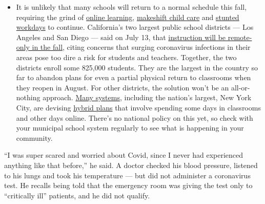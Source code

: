 \begin{itemize}
  \begin{itemize}
  \tightlist
  \item
    It is unlikely that many schools will return to a normal schedule
    this fall, requiring the grind of
    \href{https://www.nytimes.com/2020/06/05/us/coronavirus-education-lost-learning.html?action=click\&pgtype=Article\&state=default\&region=MAIN_CONTENT_3\&context=storylines_faq}{online
    learning},
    \href{https://www.nytimes.com/2020/05/29/us/coronavirus-child-care-centers.html?action=click\&pgtype=Article\&state=default\&region=MAIN_CONTENT_3\&context=storylines_faq}{makeshift
    child care} and
    \href{https://www.nytimes.com/2020/06/03/business/economy/coronavirus-working-women.html?action=click\&pgtype=Article\&state=default\&region=MAIN_CONTENT_3\&context=storylines_faq}{stunted
    workdays} to continue. California's two largest public school
    districts --- Los Angeles and San Diego --- said on July 13, that
    \href{https://www.nytimes.com/2020/07/13/us/lausd-san-diego-school-reopening.html?action=click\&pgtype=Article\&state=default\&region=MAIN_CONTENT_3\&context=storylines_faq}{instruction
    will be remote-only in the fall}, citing concerns that surging
    coronavirus infections in their areas pose too dire a risk for
    students and teachers. Together, the two districts enroll some
    825,000 students. They are the largest in the country so far to
    abandon plans for even a partial physical return to classrooms when
    they reopen in August. For other districts, the solution won't be an
    all-or-nothing approach.
    \href{https://bioethics.jhu.edu/research-and-outreach/projects/eschool-initiative/school-policy-tracker/}{Many
    systems}, including the nation's largest, New York City, are
    devising
    \href{https://www.nytimes.com/2020/06/26/us/coronavirus-schools-reopen-fall.html?action=click\&pgtype=Article\&state=default\&region=MAIN_CONTENT_3\&context=storylines_faq}{hybrid
    plans} that involve spending some days in classrooms and other days
    online. There's no national policy on this yet, so check with your
    municipal school system regularly to see what is happening in your
    community.
  \end{itemize}
\end{itemize}

``I was super scared and worried about Covid, since I never had
experienced anything like that before,'' he said. A doctor checked his
blood pressure, listened to his lungs and took his temperature --- but
did not administer a coronavirus test. He recalls being told that the
emergency room was giving the test only to ``critically ill'' patients,
and he did not qualify.

